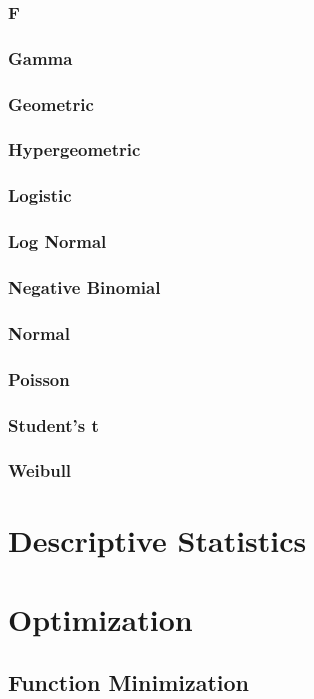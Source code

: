 \documentclass[12pt,a4paper]{article}
\begin{document}
\subsubsection{F}
\subsubsection{Gamma}
\subsubsection{Geometric}
\subsubsection{Hypergeometric}
\subsubsection{Logistic}
\subsubsection{Log Normal}
\subsubsection{Negative Binomial}
\subsubsection{Normal}
\subsubsection{Poisson}
\subsubsection{Student's t}
\subsubsection{Weibull}
\section{Descriptive Statistics}
\section{Optimization}
\subsection{Function Minimization}
\end{document}
